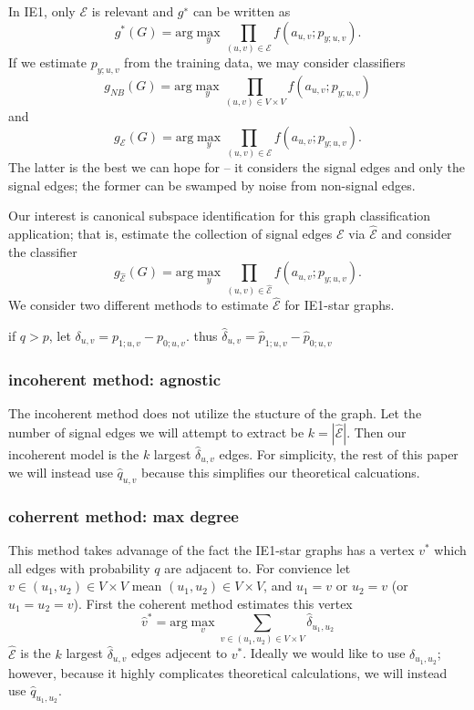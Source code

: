 \documentclass{article}
\begin{document}
In IE1, only $\mathcal{E}$ is relevant and $g^∗$ can be written as
\[
g^*(G) = \textrm{arg}\max_y \prod_{(u,v)\in \mathcal{E} } f(a_{u,v}; p_{y;u,v}).
\]
If we estimate $p_{y;u,v}$ from the training data, we may consider classifiers
\[
g_{NB}(G) = \textrm{arg}\max_y \prod_{(u,v)\in V\times V} f(a_{u,v} ; p_{y;u,v} )
\]
and
\[
g_\mathcal{E} (G) = \textrm{arg} \max_y \prod_{(u,v)\in \mathcal{E}} f(a_{u,v} ; p_{y;u,v} ).
\]
The latter is the best we can hope for – it considers the signal edges and only
the signal edges; the former can be swamped by noise from non-signal edges.

Our interest is canonical subspace identification for this graph classification
application; that is, estimate the collection of signal edges $\mathcal{E}$ via $\hat{\mathcal{E}}$ and consider
the classifier
\[
g_{\hat{\mathcal{E}}} (G) = \textrm{arg} \max_y \prod_{(u,v)\in \hat{\mathcal{E}}} f(a_{u,v} ; p_{y;u,v} ).
\]
We consider two different methods to estimate $\hat{\mathcal{E}}$ for IE1-star graphs.


if $q>p$, let $\delta_{u,v} = p_{1;u,v} - p_{0;u,v}$. thus $\hat{\delta}_{u,v} = \hat{p}_{1;u,v} - \hat{p}_{0;u,v}$

\subsubsection{incoherent method: agnostic}
The incoherent method does not utilize the stucture of the graph. Let the number of signal edges we will attempt to extract be $k=|\hat{\mathcal{E}}|$. Then our incoherent model is the $k$ largest $\hat{\delta}_{u,v}$ edges. For simplicity, the rest of this paper we will instead use $\hat{q}_{u,v}$ because this simplifies our theoretical calcuations.

\subsubsection{coherrent method: max degree}
This method takes advanage of the fact the IE1-star graphs has a vertex $v^*$ which all edges with probability $q$ are adjacent to. For convience let $v\in(u_1,u_2)\in V\times V$ mean $(u_1,u_2)\in V\times V$, and $u_1=v$ or $u_2=v$ (or $u_1=u_2=v$). First the coherent method estimates this vertex 
\[
\hat{v}^* = \textrm{arg}\max_v \sum_{v\in(u_1,u_2)\in V\times V} \hat{\delta}_{u_1, u_2}
\]
$\hat{\mathcal{E}}$ is the $k$ largest $\hat{\delta}_{u,v}$ edges adjecent to $v^*$. Ideally we would like to use $\delta_{u_1, u_2}$; however, because it highly complicates theoretical calculations, we will instead use $\hat{q}_{u_1, u_2}$. 
\end{document}
